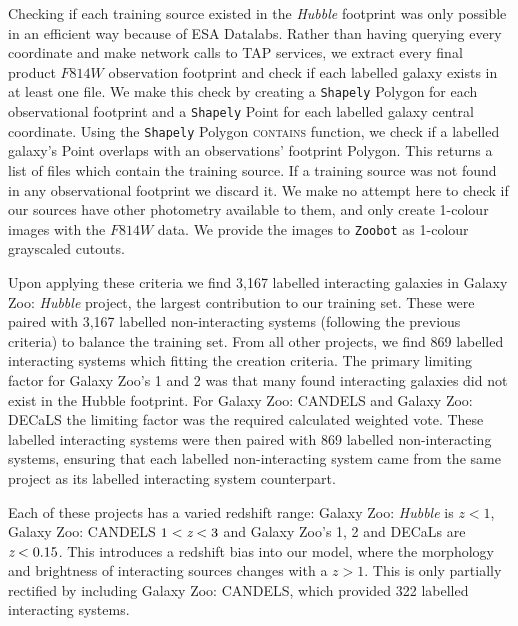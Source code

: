 Checking if each training source existed in the \emph{Hubble} footprint was only possible in an efficient way because of ESA Datalabs. Rather than having querying every coordinate and make network calls to TAP services, we extract every final product $F814W$ observation footprint and check if each labelled galaxy exists in at least one file. We make this check by creating a \texttt{Shapely} Polygon for each observational footprint and a \texttt{Shapely} Point for each labelled galaxy central coordinate. Using the \texttt{Shapely} Polygon \textsc{contains} function, we check if a labelled galaxy's Point overlaps with an observations' footprint Polygon. This returns a list of files which contain the training source. If a training source was not found in any observational footprint we discard it. We make no attempt here to check if our sources have other photometry available to them, and only create 1-colour images with the $F814W$ data. We provide the images to \texttt{Zoobot} as 1-colour grayscaled cutouts.

Upon applying these criteria we find 3,167 labelled interacting galaxies in Galaxy Zoo: \emph{Hubble} project, the largest contribution to our training set. These were paired with 3,167 labelled non-interacting systems (following the previous criteria) to balance the training set. From all other projects, we find 869 labelled interacting systems which fitting the creation criteria. The primary limiting factor for Galaxy Zoo's 1 and 2 was that many found interacting galaxies did not exist in the Hubble footprint. For Galaxy Zoo: CANDELS and Galaxy Zoo: DECaLS the limiting factor was the required calculated weighted vote. These labelled interacting systems were then paired with 869 labelled non-interacting systems, ensuring that each labelled non-interacting system came from the same project as its labelled interacting system counterpart.

Each of these projects has a varied redshift range: Galaxy Zoo: \emph{Hubble} is $z < 1$, Galaxy Zoo: CANDELS $1 < \emph{z} < 3$ and Galaxy Zoo's 1, 2 and DECaLs are $\emph{z} < 0.15$. This introduces a redshift bias into our model, where the morphology and brightness of interacting sources changes with a $z > 1$. This is only partially rectified by including Galaxy Zoo: CANDELS, which provided 322 labelled interacting systems.

